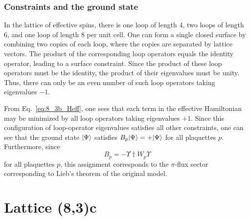 %
%
\subsubsection{Constraints and the ground state}
%
%
In the lattice of effective spins, there is one loop of length 4, two loops of length 6, and one loop of length 8 per unit cell.
One can form a single closed surface by combining two copies of each loop, where the copies are separated by lattice vectors.
The product of the corresponding loop operators equals the identity operator, leading to a surface constraint.
Since the product of these loop operators must be the identity, the product of their eigenvalues must be unity.
Thus, there can only be an even number of such loop operators taking eigenvalues $-1$.

From Eq.~\eqref{eq:8_3b_Heff}, one sees that each term in the effective Hamiltonian may be minimized by all loop operators taking eigenvalues $+1$.
Since this configuration of loop-operator eigenvalues satisfies all other constraints, one can see that the ground state $| \Psi \rangle$ satisfies $B_p | \Psi \rangle = +| \Psi \rangle$ for all plaquettes $p$.
Furthermore, since 
%
\begin{equation}
	B_p = -\Upsilon\dag W_p \Upsilon
\end{equation}
%
for all plaquettes $p$, this assignment corresponds to the $\pi$-flux sector corresponding to Lieb's theorem of the original model.


%
%
\section{Lattice (8,3)c}
\label{appendix:LoopModels_8_3c}
%
%
